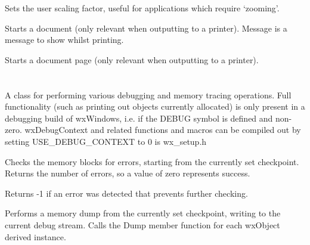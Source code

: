 \label{wxdcsetuserscale}


Sets the user scaling factor, useful for applications which require
`zooming'.



Starts a document (only relevant when outputting to a printer).
Message is a message to show whilst printing.



Starts a document page (only relevant when outputting to a printer).



\section{}\label{wxdebugcontext}


A class for performing various debugging and memory tracing
operations. Full functionality (such as printing out objects
currently allocated) is only present in a debugging build of wxWindows,
i.e. if the DEBUG symbol is defined and non-zero. wxDebugContext
and related functions and macros can be compiled out by setting
USE\_DEBUG\_CONTEXT to 0 is wx\_setup.h



Checks the memory blocks for errors, starting from the currently set
checkpoint. Returns the number of errors,
so a value of zero represents success.

Returns -1 if an error was detected that prevents further checking.



Performs a memory dump from the currently set checkpoint, writing to the
current debug stream. Calls the Dump member function for each wxObject
derived instance.



